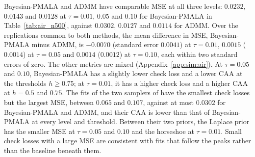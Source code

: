 Bayesian-PMALA and ADMM have comparable MSE at all three levels: $0.0232$, $0.0143$ and $0.0128$ at $\tau=0.01$, $0.05$ and $0.10$ for Bayesian-PMALA in Table~\ref{tab:air_n500}, against $0.0302$, $0.0127$ and $0.0114$ for ADMM. Over the replications common to both methods, the mean difference in MSE, Bayesian-PMALA minus ADMM, is $-0.0070$ (standard error $0.0041$) at $\tau=0.01$, $0.0015$ ($0.0014$) at $\tau=0.05$ and $0.0014$ ($0.0012$) at $\tau=0.10$, each within two standard errors of zero. The other metrics are mixed (Appendix~\ref{app:sim:air}). At $\tau=0.05$ and $0.10$, Bayesian-PMALA has a slightly lower check loss and a lower CAA at the thresholds $h\ge0.75$; at $\tau=0.01$, it has a higher check loss and a higher CAA at $h=0.5$ and $0.75$. The fits of the two samplers of \citet{onizuka2024fast} have the smallest check losses but the largest MSE, between $0.065$ and $0.107$, against at most $0.0302$ for Bayesian-PMALA and ADMM, and their CAA is lower than that of Bayesian-PMALA at every level and threshold. Between their two priors, the Laplace prior has the smaller MSE at $\tau=0.05$ and $0.10$ and the horseshoe at $\tau=0.01$. Small check losses with a large MSE are consistent with fits that follow the peaks rather than the baseline beneath them.

